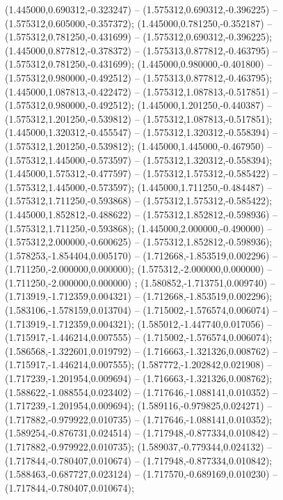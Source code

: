  (1.445000,0.690312,-0.323247) -- (1.575312,0.690312,-0.396225) -- (1.575312,0.605000,-0.357372);
 (1.445000,0.781250,-0.352187) -- (1.575312,0.781250,-0.431699) -- (1.575312,0.690312,-0.396225);
 (1.445000,0.877812,-0.378372) -- (1.575313,0.877812,-0.463795) -- (1.575312,0.781250,-0.431699);
 (1.445000,0.980000,-0.401800) -- (1.575312,0.980000,-0.492512) -- (1.575313,0.877812,-0.463795);
 (1.445000,1.087813,-0.422472) -- (1.575312,1.087813,-0.517851) -- (1.575312,0.980000,-0.492512);
 (1.445000,1.201250,-0.440387) -- (1.575312,1.201250,-0.539812) -- (1.575312,1.087813,-0.517851);
 (1.445000,1.320312,-0.455547) -- (1.575312,1.320312,-0.558394) -- (1.575312,1.201250,-0.539812);
 (1.445000,1.445000,-0.467950) -- (1.575312,1.445000,-0.573597) -- (1.575312,1.320312,-0.558394);
 (1.445000,1.575312,-0.477597) -- (1.575312,1.575312,-0.585422) -- (1.575312,1.445000,-0.573597);
 (1.445000,1.711250,-0.484487) -- (1.575312,1.711250,-0.593868) -- (1.575312,1.575312,-0.585422);
 (1.445000,1.852812,-0.488622) -- (1.575312,1.852812,-0.598936) -- (1.575312,1.711250,-0.593868);
 (1.445000,2.000000,-0.490000) -- (1.575312,2.000000,-0.600625) -- (1.575312,1.852812,-0.598936);
 (1.578253,-1.854404,0.005170) -- (1.712668,-1.853519,0.002296) -- (1.711250,-2.000000,0.000000);
 (1.575312,-2.000000,0.000000) -- (1.711250,-2.000000,0.000000) ;
 (1.580852,-1.713751,0.009740) -- (1.713919,-1.712359,0.004321) -- (1.712668,-1.853519,0.002296);
 (1.583106,-1.578159,0.013704) -- (1.715002,-1.576574,0.006074) -- (1.713919,-1.712359,0.004321);
 (1.585012,-1.447740,0.017056) -- (1.715917,-1.446214,0.007555) -- (1.715002,-1.576574,0.006074);
 (1.586568,-1.322601,0.019792) -- (1.716663,-1.321326,0.008762) -- (1.715917,-1.446214,0.007555);
 (1.587772,-1.202842,0.021908) -- (1.717239,-1.201954,0.009694) -- (1.716663,-1.321326,0.008762);
 (1.588622,-1.088554,0.023402) -- (1.717646,-1.088141,0.010352) -- (1.717239,-1.201954,0.009694);
 (1.589116,-0.979825,0.024271) -- (1.717882,-0.979922,0.010735) -- (1.717646,-1.088141,0.010352);
 (1.589254,-0.876731,0.024514) -- (1.717948,-0.877334,0.010842) -- (1.717882,-0.979922,0.010735);
 (1.589037,-0.779344,0.024132) -- (1.717844,-0.780407,0.010674) -- (1.717948,-0.877334,0.010842);
 (1.588463,-0.687727,0.023124) -- (1.717570,-0.689169,0.010230) -- (1.717844,-0.780407,0.010674);
